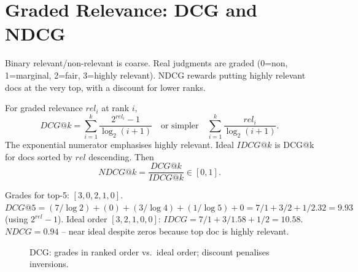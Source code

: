 \section{Graded Relevance: DCG and NDCG}\label{sec:ndcg}
Binary relevant/non-relevant is coarse. Real judgments are graded (0=non, 1=marginal, 2=fair, 3=highly relevant). NDCG rewards putting highly relevant docs at the very top, with a discount for lower ranks.

\begin{definition}
For graded relevance $rel_i$ at rank $i$,
\begin{equation}
DCG@k = \sum_{i=1}^{k} \frac{2^{rel_i}-1}{\log_2(i+1)}\quad\text{or simpler}\quad \sum_{i=1}^{k}\frac{rel_i}{\log_2(i+1)}.
\end{equation}
The exponential numerator emphasises highly relevant. Ideal $IDCG@k$ is DCG@k for docs sorted by $rel$ descending. Then
\begin{equation}
NDCG@k = \frac{DCG@k}{IDCG@k}\in[0,1].
\end{equation}
\end{definition}

\begin{example}[NDCG]
Grades for top-5: $[3,0,2,1,0]$. $DCG@5 = (7/\log2)+(0)+(3/\log4)+(1/\log5)+0 =7/1+3/2+1/2.32=9.93$ (using $2^{rel}-1$). Ideal order $[3,2,1,0,0]$: $IDCG=7/1+3/1.58+1/2=10.58$. $NDCG=0.94$ -- near ideal despite zeros because top doc is highly relevant.
\end{example}

\begin{figure}[h]\centering
{}
\caption{DCG: grades in ranked order vs.\ ideal order; discount penalises inversions.}
\label{fig:dcg}
\end{figure}

